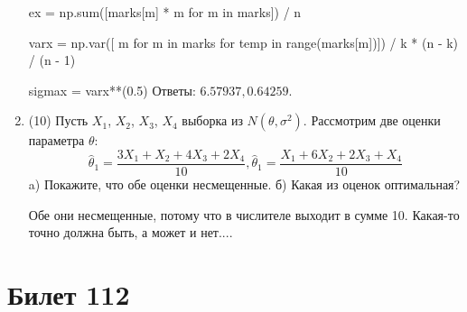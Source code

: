 \documentclass[a4paper,12pt]{article}
\begin{document}
\begin{enumerate}
    ex = np.sum([marks[m] * m for m in marks]) / n

    varx = np.var([ m for m in marks for temp in range(marks[m])]) / k * (n - k) / (n - 1)

    sigmax = varx**(0.5)
    Ответы: $6.57937, 0.64259$.

    

\item


(10) Пусть $X _{1}$, $X _{2}$, $X _{3}$, $X _{4}$ выборка из $N(\theta, \sigma ^{2})$. Рассмотрим две оценки параметра $\theta$:
\[\hat \theta _{1} = \frac{3X _{1} + X _{2} + 4X _{3} + 2X _{4}}{10}, \hat \theta _{1} = \frac{X _{1} + 6X _{2} + 2X _{3} + X _{4}}{10}\]
a) Покажите, что обе оценки несмещенные.
б) Какая из оценок оптимальная?




Обе они несмещенные, потому что в числителе выходит в сумме 10.
Какая-то точно должна быть, а может и нет....



\end{enumerate}

\section{Билет 112}
\end{document}
